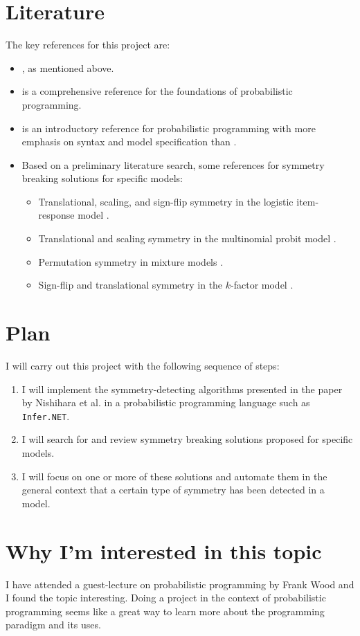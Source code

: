 \documentclass[]{STAT_547C}
\begin{document}
\section{Literature}

The key references for this project are:

\begin{itemize}
\item \cite{Nishihara:2013}, as mentioned above.
\item \cite{Rainforth:2017} is a comprehensive reference for the foundations of probabilistic programming.
\item \cite{Meent:2018} is an introductory reference for probabilistic programming with more emphasis on syntax and model specification than \cite{Rainforth:2017}.
\item Based on a preliminary literature search, some references for symmetry breaking solutions for specific models:
\begin{itemize}
\item Translational, scaling, and sign-flip symmetry in the logistic item-response model \cite{Bafumi:2005}.
\item Translational and scaling symmetry in the multinomial probit model \cite{Nobile:1998}.
\item Permutation symmetry in mixture models \cite{Stephens:2000}.
\item Sign-flip and translational symmetry in the $k$-factor model \cite{Lopes:2004,Erosheva:2017}.
\end{itemize}
\end{itemize}


\section{Plan}

I will carry out this project with the following sequence of steps: 
\begin{enumerate}
\item I will implement the symmetry-detecting algorithms presented in the paper by Nishihara et al. \cite{Nishihara:2013} in a probabilistic programming language such as \verb|Infer.NET|.
\item I will search for and review symmetry breaking solutions proposed for specific models.
\item I will focus on one or more of these solutions and automate them in the general context that a certain type of symmetry has been detected in a model.
\end{enumerate}


\section{Why I'm interested in this topic}

I have attended a guest-lecture on probabilistic programming by Frank Wood and I found the topic interesting. Doing a project in the context of probabilistic programming seems like a great way to learn more about the programming paradigm and its uses.


\printbibliography
\end{document}
